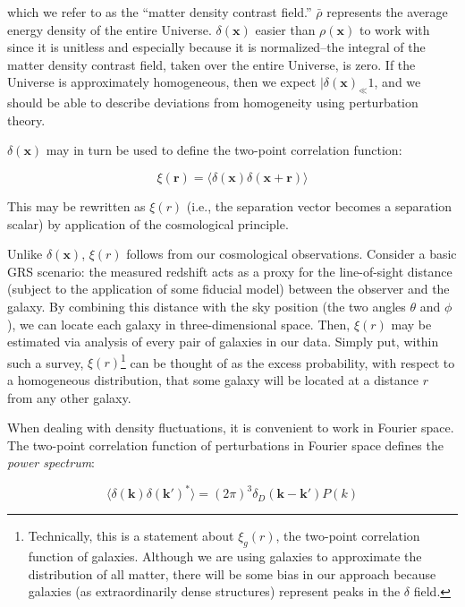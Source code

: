 which we refer to as the ``matter density contrast field.'' $\bar{\rho}$
represents the average energy density of the entire Universe. 
$\delta(\bm{x})$ easier than $\rho(\bm{x})$ to work with since it
is unitless and especially because it is normalized--the integral of the
matter density contrast field, taken over the entire Universe, is zero.
If the Universe is approximately homogeneous, then we expect
$|\delta(\bm{x})_ \ll 1$, and we should be able to describe
deviations from homogeneity using perturbation theory.

$\delta(\bm{x})$ may in turn be used to define the two-point correlation 
function:

\begin{equation}
\xi(\bm{r})
=
\langle \delta (\mathbf{x}) \delta(\mathbf{x} + \mathbf{r})\rangle
\end{equation}

This may be rewritten as $\xi(r)$ (i.e., the separation vector becomes a
separation scalar) by application of the cosmological principle.

Unlike $\delta(\bm{x})$, $\xi(r)$ follows from our cosmological
observations. Consider a basic GRS scenario: the
measured redshift acts as a proxy for the line-of-sight distance (subject to
the application of some fiducial model) between the observer and the galaxy. 
By combining this distance with the sky position (the two angles $\theta$ and
$\phi$), we can locate each galaxy in three-dimensional space. Then, $\xi(r)$ 
may be estimated via analysis of every pair of galaxies in our data. Simply
put, within such a survey, $\xi(r)$\footnote{Technically, this is a statement
about $\xi_g(r)$, the two-point correlation function of galaxies. Although we
are using galaxies to approximate the distribution of all matter, there will
be some bias in our approach because galaxies (as extraordinarily dense 
structures) represent peaks in the $\delta$ field.} can be thought
of as the excess probability, with respect to a homogeneous distribution, that 
some galaxy will be located at a distance $r$ from any other galaxy.

When dealing with density fluctuations, it is convenient to work in Fourier
space. The two-point correlation
function of perturbations in Fourier space
defines the \textit{power spectrum}:

\begin{equation}
\langle \delta (\bm{k}) \delta (\bm{k}')^* \rangle
=
(2 \pi)^3 \delta_D (\bm{k} - \bm{k}') P(k)
\end{equation}

